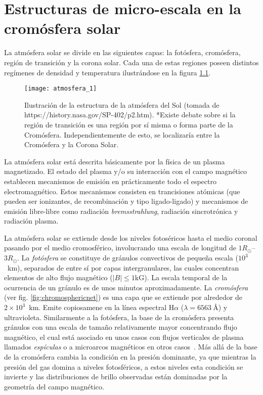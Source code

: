 \chapter{Estructuras de micro-escala en la crom\'osfera solar}

La atm\'osfera solar se divide en las siguientes capas: la fot\'osfera, crom\'osfera, regi\'on de transici\'on y la corona solar. Cada una de estas regiones poseen distintos reg\'imenes de densidad y temperatura ilustr\'andose en la figura \ref{atmosfera_solar}.

\begin{figure}[h]
\centering
\texttt{[image: atmosfera\_1]}
\caption{Ilustraci\'on de la estructura de la atm\'osfera del Sol (tomada de https://history.nasa.gov/SP-402/p2.htm). \newline
*Existe debate sobre si la regi\'on de transici\'on es una regi\'on por s\'i misma o forma parte de la Crom\'osfera. Independientemente de esto, se localizar\'ia entre la Crom\'osfera y la Corona Solar.} \label{atmosfera_solar}
\end{figure}

La atm\'osfera solar est\'a descrita b\'asicamente por la f\'isica de un plasma magnetizado. El estado del plasma y/o su interacci\'on con el campo magn\'etico establecen mecanismos de emisi\'on en pr\'acticamente todo el espectro electromagn\'etico. Estos mecanismos consisten en trancisiones at\'omicas (que pueden ser ionizantes, de recombinaci\'on y tipo ligado-ligado) y mecanismos de emisi\'on libre-libre como radiaci\'on \emph{bremsstrahlung}, radiaci\'on sincrotr\'onica y radiaci\'on plasma.

La atm\'osfera solar se extiende desde los niveles fotos\'ericos hasta el medio coronal pasando por el medio cromosf\'erico, involucrando una escala de longitud de $1R_{\odot}$--$3R_{\odot}$. La \emph{fot\'osfera} se constituye de gr\'anulos convectivos de peque\~na escala ($10^3$~km), separados de entre s\'i por capas intergranulares, las cuales concentran elementos de alto flujo magn\'etico ($|B| \le 1\mbox{kG}$). La escala temporal de la ocurrencia de un gr\'anulo es de unos minutos aproximadamente. La \emph{crom\'osfera} (ver fig. \ref{fig:chromosphericnet}) es una capa que se extiende por alrededor de $2\times 10^3$~km. Emite copiosamene en la l\'inea espectral H$\alpha$ ($\lambda=6563~\mbox{\AA}$) y ultravioleta. Similarmente a la fot\'osfera, la base de la crom\'osfera presenta gr\'anulos con una escala de tama\~no relativamente mayor concentrando flujo magn\'etico, el cual est\'a asociado en unos casos con flujos verticales de plasma llamados \emph{esp\'iculas} o a microarcos magn\'eticos en otros casos~\citep{NASAweb}. M\'as all\'a de la base de la crom\'osfera cambia la condici\'on en la presi\'on dominante, ya que mientras la presi\'on del gas domina a niveles fotosf\'ericos, a estos niveles esta condici\'on se invierte y las distribuciones de brillo observadas est\'an dominadas por la geometr\'ia del campo magn\'etico. 

